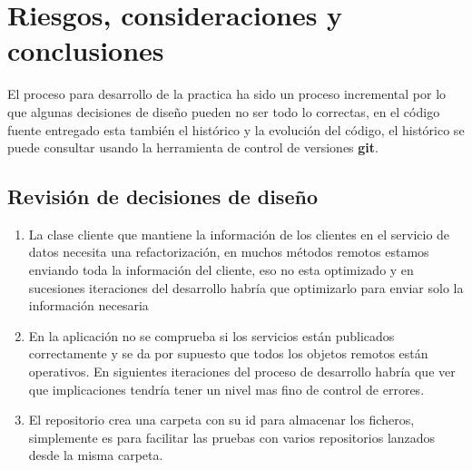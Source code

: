 \chapter{Riesgos, consideraciones y conclusiones}

El proceso para desarrollo de la practica ha sido un proceso incremental por lo que algunas decisiones de diseño pueden no ser todo lo correctas, en el código fuente entregado esta también el histórico y la evolución del código, el histórico se puede consultar usando la herramienta de control de versiones \textbf{git}.

\section{Revisión de decisiones de diseño}

\begin{enumerate}\label{sec:consideraciones_datos}
	\item La clase cliente que mantiene la información de los clientes en el servicio de datos necesita una refactorización, en muchos métodos remotos estamos enviando toda la información del cliente, eso no esta optimizado y en sucesiones iteraciones del desarrollo habría que optimizarlo para enviar solo la información necesaria
	\item En la aplicación no se comprueba si los servicios están publicados correctamente y se da por supuesto que todos los objetos remotos están operativos. En siguientes iteraciones del proceso de desarrollo habría que ver que implicaciones tendría tener un nivel mas fino de control de errores.
	\item El repositorio crea una carpeta con su id para almacenar los ficheros, simplemente es para facilitar las pruebas con varios repositorios lanzados desde la misma carpeta.
\end{enumerate}
